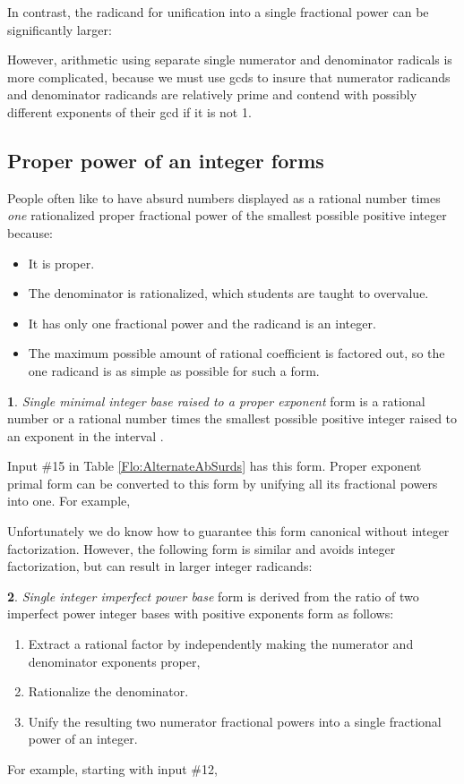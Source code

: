 \documentclass[12pt,english]{article}
\theoremstyle{definition}
\newtheorem*{defn*}{\protect\definitionname}
\theoremstyle{remark}
\theoremstyle{plain}
\theoremstyle{plain}
\providecommand{\definitionname}{Definition}
\begin{document}
In contrast, the radicand for unification into a single fractional
power can be significantly larger:



However, arithmetic using separate single numerator and denominator
radicals is more complicated, because we must use gcds to insure that
numerator radicands and denominator radicands are relatively prime
and contend with possibly different exponents of their gcd if it is
not 1.


\subsection{Proper power of an integer forms}

People often like to have absurd numbers displayed as a rational number
times \textsl{one} rationalized proper fractional power of the smallest
possible positive integer because:
\begin{itemize}
\item It is proper.
\item The denominator is rationalized, which students are taught to overvalue.
\item It has only one fractional power and the radicand is an integer.
\item The maximum possible amount of rational coefficient is factored out,
so the one radicand is as simple as possible for such a form.\end{itemize}
\begin{defn*}
\textsl{Single minimal integer base raised to a proper exponent} form
is a rational number or a rational number times the smallest possible
positive integer raised to an exponent in the interval .

Input \#15 in Table \ref{Flo:AlternateAbSurds} has this form. Proper
exponent primal form can be converted to this form by unifying all
its fractional powers into one. For example,


\end{defn*}
Unfortunately we do know how to guarantee this form canonical without
integer factorization. However, the following form is similar and
avoids integer factorization, but can result in larger integer radicands:
\begin{defn*}
\textsl{Single integer imperfect power base} form is derived from
the ratio of two imperfect power integer bases with positive exponents
form as follows:\end{defn*}
\begin{enumerate}
\item Extract a rational factor by independently making the numerator and
denominator exponents proper,
\item Rationalize the denominator.
\item Unify the resulting two numerator fractional powers into a single
fractional power of an integer.
\end{enumerate}
For example, starting with input \#12,
\end{document}
